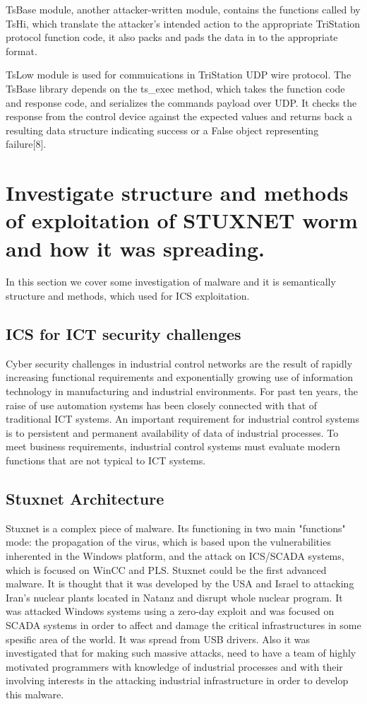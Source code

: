 \documentclass[conference]{IEEEtran}
\begin{document}
TsBase module, another attacker-written module, contains the functions called by TsHi, which translate the attacker’s intended action to the appropriate TriStation protocol function code, it also packs and pads the data in to the appropriate format.

TsLow module is used for commuications in TriStation UDP wire protocol. The TsBase library depends on the ts\_exec method, which takes the function code and  response code, and serializes the commands payload over UDP. It checks the response from the control device against the expected values and returns back a resulting data structure indicating success or a False object representing failure[8].

\section{Investigate  structure  and  methods  of  exploitation   of   STUXNET   worm   and   how   it was spreading.}
\label{sec:IST}
	In this section we cover some investigation of malware and it is semantically structure and methods, which used for ICS  exploitation.
\subsection{ICS for ICT security challenges}
Cyber security challenges in industrial control networks are the result of rapidly increasing functional requirements and exponentially growing use of information technology in manufacturing and industrial environments. For past ten years, the raise of use automation systems has been closely connected with that of traditional ICT systems. An important requirement for industrial control systems is to persistent and permanent  availability of data of industrial processes. To meet business requirements, industrial control systems must evaluate modern functions that are not typical to ICT systems.



\subsection{Stuxnet Architecture}
Stuxnet is a complex piece of malware. Its
functioning in two
main "functions" mode: the propagation of the
virus, which is based upon the
vulnerabilities inherented in the Windows
platform, and the attack on ICS/SCADA
systems, which is focused on WinCC and
PLS.
Stuxnet could be the first advanced malware. It is thought that it was developed by the USA and Israel to attacking Iran's nuclear plants located in Natanz and disrupt whole nuclear program. It was attacked Windows systems using a zero-day exploit and  was focused on SCADA systems in order to  affect and damage the critical infrastructures in some spesific area of the world. It was spread from USB drivers. Also it was investigated that for making such massive attacks, need to have a team of highly motivated programmers with  knowledge of industrial processes and with their involving interests in the attacking industrial infrastructure in order to develop this malware.
\end{document}
